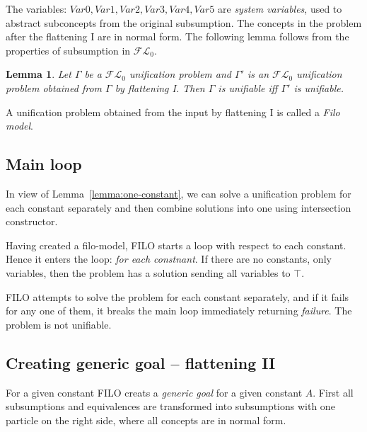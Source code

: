 \documentclass{article}
\newtheorem{lemma}{Lemma}
\newcommand{\flo}{\ensuremath{\mathcal{FL}_0}\xspace}
\begin{document}
The variables: $Var0, Var1, Var2, Var3, Var4, Var5$ are \emph{system variables}, used to abstract subconcepts from the original subsumption.
The concepts in the problem after the flattening I are in normal form.
The following lemma follows from the properties of subsumption in \flo.
\begin{lemma} \label{lemma:flatteningone}
	Let $\Gamma$ be a \flo unification problem and $\Gamma'$ is an \flo unification problem obtained from
	$\Gamma$ by flattening I. Then $\Gamma$ is unifiable iff $\Gamma'$ is unifiable.
	\end{lemma}
	
A unification problem obtained from the input by flattening I is called a \emph{Filo model}.
	
	\subsection{Main loop}

In view of Lemma~\ref{lemma:one-constant}, we can solve a unification problem for each constant separately and
then combine solutions into one using intersection constructor.

Having created a filo-model, FILO starts a loop with respect to each constant.
Hence it enters the loop: \emph{for each constnant}. If there are no constants, only variables, then
the problem has a solution sending all variables to $\top$.

FILO attempts to solve the problem for each constant separately, and if it fails for any one of them,
it breaks the main loop immediately returning \emph{failure}. The problem is not unifiable.

\subsection{Creating generic goal -- flattening II}
For a given  constant FILO creats a \emph{generic goal} for a given constant $A$.
First all subsumptions and equivalences are transformed into subsumptions with one particle on the right side,
where all concepts are in normal form.
\end{document}
